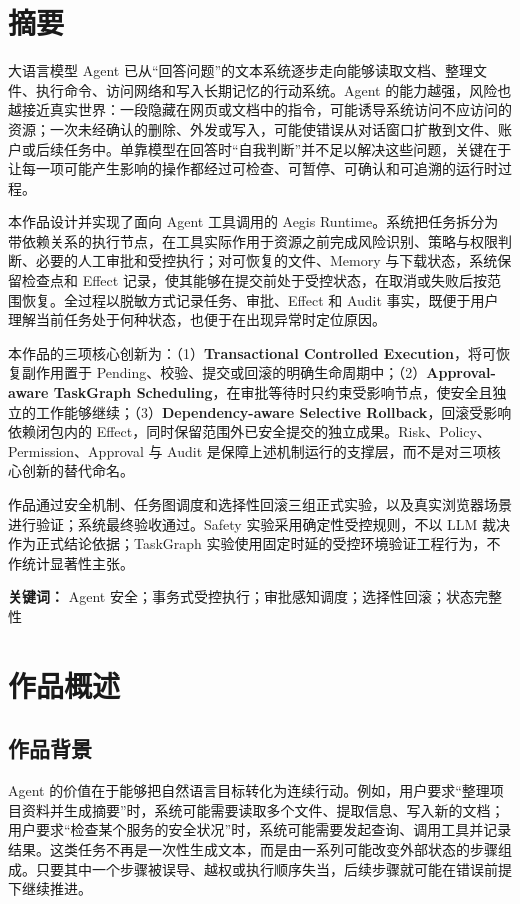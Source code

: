 \chapter*{摘\quad 要}

大语言模型 Agent 已从“回答问题”的文本系统逐步走向能够读取文档、整理文件、执行命令、访问网络和写入长期记忆的行动系统。Agent 的能力越强，风险也越接近真实世界：一段隐藏在网页或文档中的指令，可能诱导系统访问不应访问的资源；一次未经确认的删除、外发或写入，可能使错误从对话窗口扩散到文件、账户或后续任务中。单靠模型在回答时“自我判断”并不足以解决这些问题，关键在于让每一项可能产生影响的操作都经过可检查、可暂停、可确认和可追溯的运行时过程。

本作品设计并实现了面向 Agent 工具调用的 Aegis Runtime。系统把任务拆分为带依赖关系的执行节点，在工具实际作用于资源之前完成风险识别、策略与权限判断、必要的人工审批和受控执行；对可恢复的文件、Memory 与下载状态，系统保留检查点和 Effect 记录，使其能够在提交前处于受控状态，在取消或失败后按范围恢复。全过程以脱敏方式记录任务、审批、Effect 和 Audit 事实，既便于用户理解当前任务处于何种状态，也便于在出现异常时定位原因。

本作品的三项核心创新为：（1）\textbf{Transactional Controlled Execution}，将可恢复副作用置于 Pending、校验、提交或回滚的明确生命周期中；（2）\textbf{Approval-aware TaskGraph Scheduling}，在审批等待时只约束受影响节点，使安全且独立的工作能够继续；（3）\textbf{Dependency-aware Selective Rollback}，回滚受影响依赖闭包内的 Effect，同时保留范围外已安全提交的独立成果。Risk、Policy、Permission、Approval 与 Audit 是保障上述机制运行的支撑层，而不是对三项核心创新的替代命名。

作品通过安全机制、任务图调度和选择性回滚三组正式实验，以及真实浏览器场景进行验证；系统最终验收通过。Safety 实验采用确定性受控规则，不以 LLM 裁决作为正式结论依据；TaskGraph 实验使用固定时延的受控环境验证工程行为，不作统计显著性主张。

\vspace{1em}
\noindent\textbf{关键词：} Agent 安全；事务式受控执行；审批感知调度；选择性回滚；状态完整性

\chapter{作品概述}

\section{作品背景}

Agent 的价值在于能够把自然语言目标转化为连续行动。例如，用户要求“整理项目资料并生成摘要”时，系统可能需要读取多个文件、提取信息、写入新的文档；用户要求“检查某个服务的安全状况”时，系统可能需要发起查询、调用工具并记录结果。这类任务不再是一次性生成文本，而是由一系列可能改变外部状态的步骤组成。只要其中一个步骤被误导、越权或执行顺序失当，后续步骤就可能在错误前提下继续推进。

